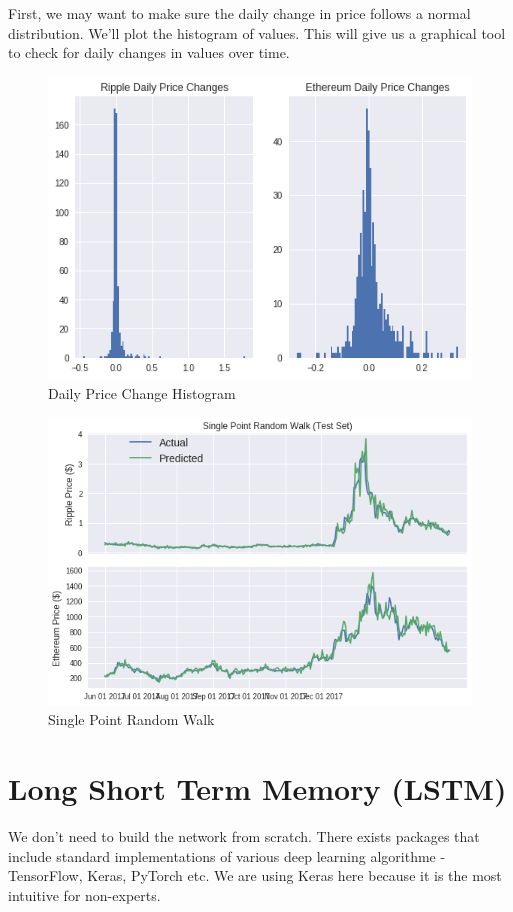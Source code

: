 First, we may want to make sure the daily change in price follows a normal distribution. We'll plot the histogram of values. This will give us a graphical tool to check for daily changes in values over time.

\begin{figure}[h]
    \centering \includegraphics[scale=0.5]{images/price-change.png}
    \caption{Daily Price Change Histogram}
\end{figure}


\begin{figure}[h]
    \centering \includegraphics[scale=0.5]{images/single-price.png}
    \caption{Single Point Random Walk}
\end{figure}    


\section{Long Short Term Memory (LSTM)}
We don't need to build the network from scratch. There exists packages that include standard implementations of various deep learning algorithme - TensorFlow, Keras, PyTorch etc. We are using Keras here because it is the most intuitive for non-experts.

